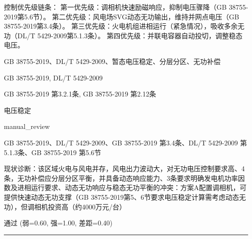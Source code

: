 \documentclass[11pt,a4paper]{ctexart}
\begin{document}
\begin{description}[leftmargin=1.5em,style=nextline,font=\normalfont]
控制优先级链条：
第一优先级：调相机快速励磁响应，抑制电压骤降（GB 38755-2019第5.6节）。
第二优先级：风电场SVG动态无功输出，维持并网点电压（GB 38755-2019第3.4条）。
第三优先级：火电机组进相运行（紧急情况），吸收多余无功（DL/T 5429-2009第5.1.3条）。
第四优先级：并联电容器自动投切，调整稳态电压。
  \item[KW:] GB 38755-2019、DL/T 5429-2009、暂态电压稳定、分层分区、无功补偿
  \item[标准:] GB 38755-2019, DL/T 5429-2009
  \item[条款溯源:] GB 38755-2019 第3.2.1条, GB 38755-2019 第2.12条
  \item[主题:] 电压稳定
  \item[评分方式:] manual\_review
  \item[Rubric条款:] GB 38755-2019、DL/T 5429-2009、GB 38755-2019 第3.4条、DL/T 5429-2009 第5.1.3条、GB 38755-2019 第5.6节
  \item[Rubric判据:] 现状诊断：该区域火电与风电并存，风电出力波动大，对无功电压控制要求高、4条，无功补偿应分层分区平衡，并具备动态响应能力、3条要求明确发电机功率因数及进相运行要求、动态无功响应与稳态无功平衡的冲突：方案A配置调相机，可提供快速动态无功支撑（GB 38755-2019第5、6节要求电压稳定计算需考虑动态无功），但调相机投资高（约4000万元/台）
  \item[LJ判定:] 通过 (弱=0.60, 强=1.00, 差距=0.40)
\end{description}
\vspace{4pt}
\hrule
\vspace{6pt}
\end{document}
